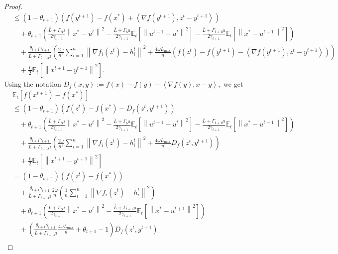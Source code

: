\documentclass{article} %
\newcommand{\norm}[1]{\left\| #1 \right\|}
\newcommand{\inp}[2]{\left\langle#1,#2\right\rangle} %
\newcommand{\ExpSub}[2]{{\mathbb{E}}_{#1}\left[#2\right]}
\theoremstyle{plain}
\theoremstyle{definition}
\theoremstyle{remark}
\newcommand{\eqdef}{:=}
\begin{document}
\begin{proof}
\begin{equation*}
\begin{aligned}
    &\leq (1 - \theta_{t+1}) \left(f(y^{t+1}) - f(x^*) + \inp{\nabla f(y^{t+1})}{z^t - y^{t+1}}\right) \\
    &\quad+ \theta_{t+1} \left(\frac{\bar{L} + \Gamma_{t} \mu}{2 \gamma_{t+1}} \norm{x^* - u^t}^2 - \frac{\bar{L} + \Gamma_{t} \mu}{2 \gamma_{t+1}} \ExpSub{t}{\norm{u^{t+1} - u^t}^2} - \frac{\bar{L} + \Gamma_{t+1} \mu}{2 \gamma_{t+1}} \ExpSub{t}{\norm{x^* - u^{t+1}}^2}\right) \\
    &\quad+ \frac{\theta_{t+1} \gamma_{t+1}}{\bar{L} + \Gamma_{t+1} \mu} \left(\frac{2 \omega}{n^2} \sum_{i=1}^n \norm{\nabla f_i(z^{t}) - h_i^t}^2 + \frac{4 \omega L_{\max}}{n} (f(z^t) - f(y^{t+1}) - \inp{\nabla f(y^{t+1})}{z^t - y^{t+1}})\right) \\
    &\quad+ \frac{L}{2} \ExpSub{t}{\norm{x^{t+1} - y^{t+1}}^2}.
  \end{aligned}
\end{equation*}
Using the notation $D_f(x, y) \eqdef f(x) - f(y) - \inp{\nabla f(y)}{x - y},$ we get
\begin{equation*}
  \begin{aligned}
    &\ExpSub{t}{f(x^{t+1}) - f(x^*)} \\
    &\leq (1 - \theta_{t+1}) \left(f(z^{t}) - f(x^*) - D_f(z^t, y^{t+1})\right) \\
    &\quad+ \theta_{t+1} \left(\frac{\bar{L} + \Gamma_{t} \mu}{2 \gamma_{t+1}} \norm{x^* - u^t}^2 - \frac{\bar{L} + \Gamma_{t} \mu}{2 \gamma_{t+1}} \ExpSub{t}{\norm{u^{t+1} - u^t}^2} - \frac{\bar{L} + \Gamma_{t+1} \mu}{2 \gamma_{t+1}} \ExpSub{t}{\norm{x^* - u^{t+1}}^2}\right) \\
    &\quad+ \frac{\theta_{t+1} \gamma_{t+1}}{\bar{L} + \Gamma_{t+1} \mu} \left(\frac{2 \omega}{n^2} \sum_{i=1}^n \norm{\nabla f_i(z^{t}) - h_i^t}^2 + \frac{4 \omega L_{\max}}{n} D_f(z^t, y^{t+1})\right) \\
    &\quad+ \frac{L}{2} \ExpSub{t}{\norm{x^{t+1} - y^{t+1}}^2} \\
    &= (1 - \theta_{t+1}) \left(f(z^{t}) - f(x^*)\right) \\
    &\quad + \frac{\theta_{t+1} \gamma_{t+1}}{\bar{L} + \Gamma_{t+1} \mu} \frac{2 \omega}{n} \left(\frac{1}{n}\sum_{i=1}^n \norm{\nabla f_i(z^{t}) - h_i^t}^2\right) \\
    &\quad+ \theta_{t+1} \left(\frac{\bar{L} + \Gamma_{t} \mu}{2 \gamma_{t+1}} \norm{x^* - u^t}^2 - \frac{\bar{L} + \Gamma_{t+1} \mu}{2 \gamma_{t+1}} \ExpSub{t}{\norm{x^* - u^{t+1}}^2}\right) \\
    &\quad+ \left(\frac{\theta_{t+1} \gamma_{t+1}}{\bar{L} + \Gamma_{t+1} \mu} \frac{4 \omega L_{\max}}{n} + \theta_{t+1} - 1 \right) D_f(z^t, y^{t+1}) \\

\end{aligned}
\end{equation*}
\end{proof}
\end{document}
